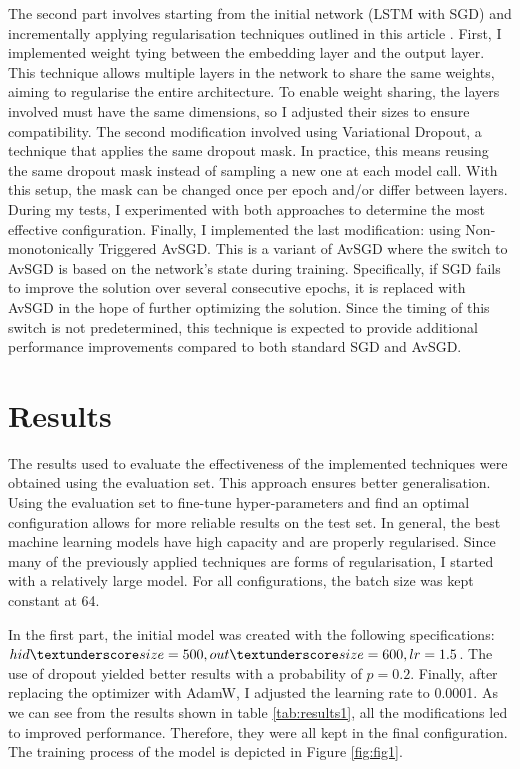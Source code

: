 \documentclass[a4paper]{article}
\begin{document}
The second part involves starting from the initial network (LSTM with SGD) and incrementally applying regularisation techniques outlined in this article \cite{merity2017regularizing}.
First, I implemented weight tying between the embedding layer and the output layer.
This technique allows multiple layers in the network to share the same weights, aiming to regularise the entire architecture.
To enable weight sharing, the layers involved must have the same dimensions, so I adjusted their sizes to ensure compatibility.
The second modification involved using Variational Dropout, a technique that applies the same dropout mask.
In practice, this means reusing the same dropout mask instead of sampling a new one at each model call.
With this setup, the mask can be changed once per epoch and/or differ between layers.
During my tests, I experimented with both approaches to determine the most effective configuration.
Finally, I implemented the last modification: using Non-monotonically Triggered AvSGD. This is a variant of AvSGD where the switch to AvSGD is based on the network’s state during training.
Specifically, if SGD fails to improve the solution over several consecutive epochs, it is replaced with AvSGD in the hope of further optimizing the solution.
Since the timing of this switch is not predetermined, this technique is expected to provide additional performance improvements compared to both standard SGD and AvSGD.

\section{Results}
The results used to evaluate the effectiveness of the implemented techniques were obtained using the evaluation set. This approach ensures better generalisation. Using the evaluation set to fine-tune hyper-parameters and find an optimal configuration allows for more reliable results on the test set.
In general, the best machine learning models have high capacity and are properly regularised. Since many of the previously applied techniques are forms of regularisation, I started with a relatively large model.
For all configurations, the batch size was kept constant at 64.


In the first part, the initial model was created with the following specifications: \(hid \textunderscore size=500, out \textunderscore size=600, lr=1.5\).
The use of dropout yielded better results with a probability of \(p=0.2\). Finally, after replacing the optimizer with AdamW, I adjusted the learning rate to 0.0001.
As we can see from the results shown in table \ref{tab:results1}, all the modifications led to improved performance. Therefore, they were all kept in the final configuration.
The training process of the model is depicted in Figure \ref{fig:fig1}.
\end{document}
